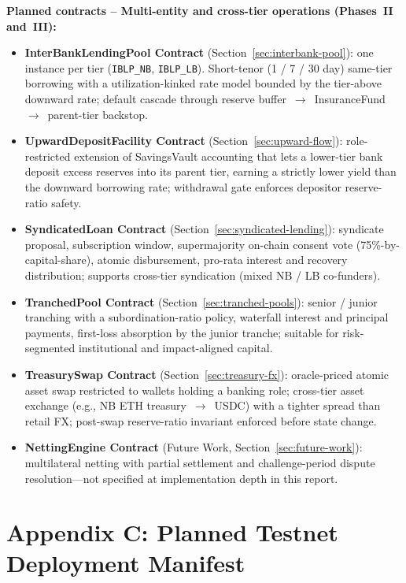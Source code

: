 \documentclass[12pt,a4paper]{report}
\begin{document}
\textbf{Planned contracts -- Multi-entity and cross-tier operations (Phases~II and~III):}
\begin{itemize}[noitemsep]
\item \textbf{InterBankLendingPool Contract} (Section~\ref{sec:interbank-pool}): one instance per tier (\texttt{IBLP\_NB}, \texttt{IBLP\_LB}). Short-tenor (1 / 7 / 30 day) same-tier borrowing with a utilization-kinked rate model bounded by the tier-above downward rate; default cascade through reserve buffer~$\to$~InsuranceFund~$\to$~parent-tier backstop.
\item \textbf{UpwardDepositFacility Contract} (Section~\ref{sec:upward-flow}): role-restricted extension of SavingsVault accounting that lets a lower-tier bank deposit excess reserves into its parent tier, earning a strictly lower yield than the downward borrowing rate; withdrawal gate enforces depositor reserve-ratio safety.
\item \textbf{SyndicatedLoan Contract} (Section~\ref{sec:syndicated-lending}): syndicate proposal, subscription window, supermajority on-chain consent vote (75\%-by-capital-share), atomic disbursement, pro-rata interest and recovery distribution; supports cross-tier syndication (mixed NB / LB co-funders).
\item \textbf{TranchedPool Contract} (Section~\ref{sec:tranched-pools}): senior / junior tranching with a subordination-ratio policy, waterfall interest and principal payments, first-loss absorption by the junior tranche; suitable for risk-segmented institutional and impact-aligned capital.
\item \textbf{TreasurySwap Contract} (Section~\ref{sec:treasury-fx}): oracle-priced atomic asset swap restricted to wallets holding a banking role; cross-tier asset exchange (e.g., NB ETH treasury~$\to$~USDC) with a tighter spread than retail FX; post-swap reserve-ratio invariant enforced before state change.
\item \textbf{NettingEngine Contract} (Future Work, Section~\ref{sec:future-work}): multilateral netting with partial settlement and challenge-period dispute resolution---not specified at implementation depth in this report.
\end{itemize}


\chapter*{Appendix C: Planned Testnet Deployment Manifest}
{}
\end{document}
